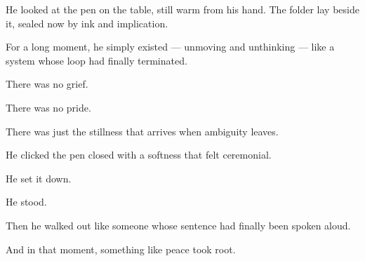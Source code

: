 He looked at the pen on the table, still warm from his hand.
The folder lay beside it, sealed now by ink and implication.

For a long moment, he simply existed --- unmoving and unthinking --- like a system whose loop had 
finally terminated.

There was no grief.

There was no pride.

There was just the stillness that arrives when ambiguity leaves.

He clicked the pen closed with a softness that felt ceremonial.

He set it down.

He stood.

Then he walked out like someone whose sentence had finally been spoken aloud.

And in that moment, something like peace took root.

